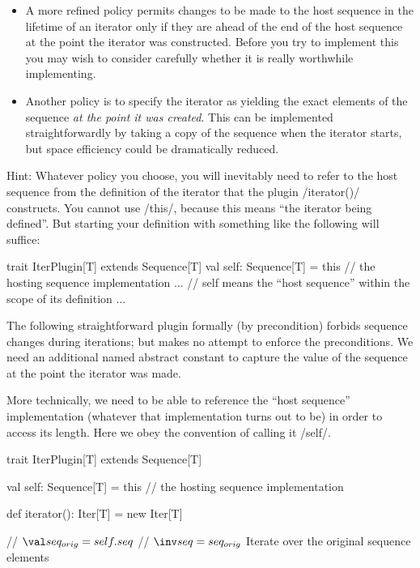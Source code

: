 \documentclass{ip3}
\begin{document}
\begin{foil}
\begin{exercise}
\begin{itemize}
\item A  more refined policy permits changes to be made to the host sequence in
the lifetime of an iterator only if they are ahead of the end of the host
sequence at the point the iterator was constructed. Before you try to
implement this you may wish to consider carefully whether it is really
worthwhile implementing.

\item Another policy is to specify the iterator as yielding the exact elements of
the sequence \textit{at the point it was created}. This can be implemented
straightforwardly by taking a copy of the sequence when the iterator
starts, but space efficiency could be dramatically reduced.
\end{itemize}

Hint: Whatever policy you choose, you will inevitably need to refer to the
host sequence from the definition of the iterator that the plugin
\sc/iterator()/ constructs. You cannot use \sc/this/, because this means
``the iterator being defined''. But starting your definition with something
like the following will suffice:

\begin{scala}

  trait IterPlugin[T] extends Sequence[T] {
     val self: Sequence[T] = this // the hosting sequence implementation
     ...  
     // self means the ``host sequence'' within the scope of its definition
     ...
  }
\end{scala}


\answernewpage \begin{answer} The following straightforward plugin formally
(by precondition) forbids sequence changes during iterations; but makes no
attempt to enforce the preconditions. We need an additional named abstract
constant to capture the value of the sequence at the point the iterator was
made.

More technically, we need to be able to reference the ``host sequence''
implementation (whatever that implementation turns out to be) in order to
access its length. Here we obey the convention of calling it \sc/self/.
\begin{--code}
  trait IterPlugin[T] extends Sequence[T] {
     val self: Sequence[T] = this // the hosting sequence implementation

     def iterator(): Iter[T] = new Iter[T] {
         // $\val seq_{orig} = self.seq$ 
         // $\inv seq = seq_{orig}$ Iterate over the original sequence elements

}}
\end{--code}
\end{answer}
\end{exercise}
\end{foil}
\end{document}
